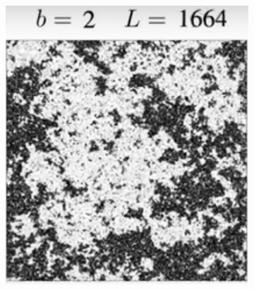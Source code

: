 \documentclass[]{article}
\begin{document}
\begin{figure}[H]
	\caption[Evolving $T=1.003T_c$ after \cite{ashton2012renormalization}]{Evolving $T=1.003T_c$ after \cite{ashton2012renormalization}. The coupling is just too weak. As we zoom out, the patches get smaller and smaller, und we end up with something resembling ''snow'' on a TV. Recall that this $T$ and the one in Figure \ref{fig:douglas:ashton1} both looked like the one in the middle of Figure \ref{fig:douglas:ashton} before we zoomed.}
	\begin{subfigure}[t]{0.3\textwidth}
		\includegraphics[width=\textwidth]{DouglasAshton2-1}
	\end{subfigure}
	\begin{subfigure}[t]{0.3\textwidth}

\end{subfigure}
\end{figure}
\end{document}
